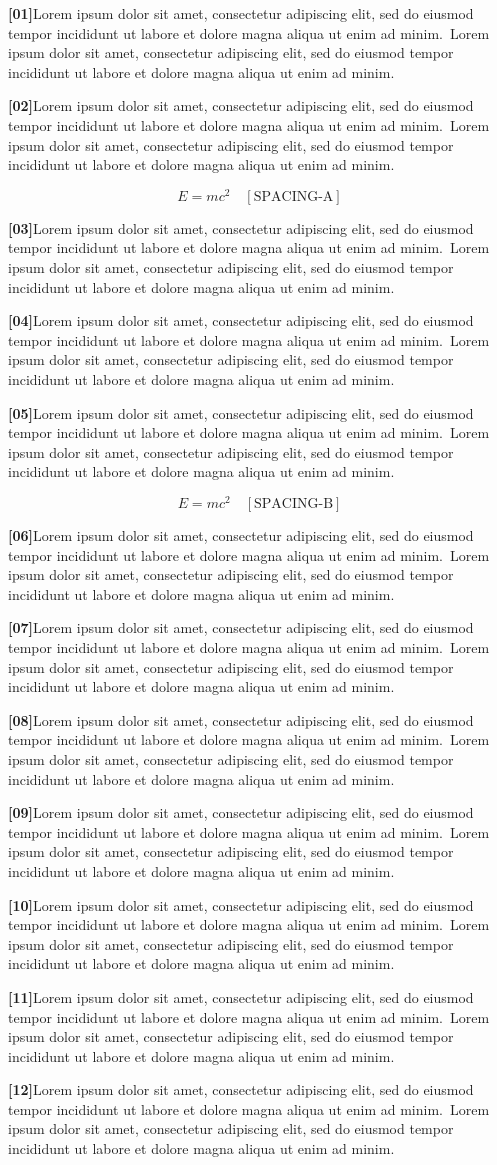 \documentclass[twocolumn]{article}
\newcommand\Body{Lorem ipsum dolor sit amet, consectetur adipiscing elit, sed do
eiusmod tempor incididunt ut labore et dolore magna aliqua ut enim ad minim.}
\newcommand\Par[1]{\par\noindent\textbf{[#1]}\space\Body\ \Body\par\medskip}
\begin{document}
\Par{01}\Par{02}
\begin{wideband}\[ E=mc^2 \quad[\text{SPACING-A}] \]\end{wideband}
\Par{03}\Par{04}\Par{05}
\setlength\wbccskipabove{18pt}\setlength\wbccskipbelow{2pt}
\setlength\wbccframesep{0pt}\setlength\wbccrulewidth{0pt}
\begin{wideband}\[ E=mc^2 \quad[\text{SPACING-B}] \]\end{wideband}
\setlength\wbccskipabove{6pt}\setlength\wbccskipbelow{6pt}
\setlength\wbccframesep{3pt}\setlength\wbccrulewidth{1pt}
\Par{06}\Par{07}\Par{08}\Par{09}\Par{10}\Par{11}\Par{12}
\end{document}
